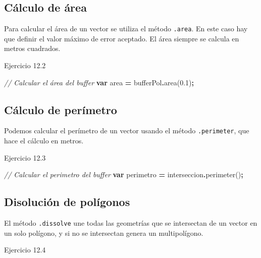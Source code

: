 \documentclass[
  12pt,
  letterpaper,
  twoside]{book}
\newenvironment{Shaded}{\begin{snugshade}}{\end{snugshade}}
\newcommand{\CommentTok}[1]{\textcolor[rgb]{0.56,0.35,0.01}{\textit{#1}}}
\newcommand{\FloatTok}[1]{\textcolor[rgb]{0.00,0.00,0.81}{#1}}
\newcommand{\FunctionTok}[1]{\textcolor[rgb]{0.00,0.00,0.00}{#1}}
\newcommand{\KeywordTok}[1]{\textcolor[rgb]{0.13,0.29,0.53}{\textbf{#1}}}
\newcommand{\NormalTok}[1]{#1}
\newcommand{\OperatorTok}[1]{\textcolor[rgb]{0.81,0.36,0.00}{\textbf{#1}}}
\begin{document}
\hypertarget{cuxe1lculo-de-uxe1rea}{%
\subsection{Cálculo de área}\label{cuxe1lculo-de-uxe1rea}}

Para calcular el área de un vector se utiliza el método \texttt{.area}. En este caso hay que definir el valor máximo de error aceptado. El área siempre se calcula en metros cuadrados.

Ejercicio 12.2

\begin{Shaded}
\begin{Highlighting}[]
\CommentTok{// Calcular el área del buffer}
\KeywordTok{var}\NormalTok{ area }\OperatorTok{=}\NormalTok{ bufferPol}\OperatorTok{.}\FunctionTok{area}\NormalTok{(}\FloatTok{0.1}\NormalTok{)}\OperatorTok{;}
\end{Highlighting}
\end{Shaded}

\hypertarget{cuxe1lculo-de-peruxedmetro}{%
\subsection{Cálculo de perímetro}\label{cuxe1lculo-de-peruxedmetro}}

Podemos calcular el perímetro de un vector usando el método \texttt{.perimeter}, que hace el cálculo en metros.

Ejercicio 12.3

\begin{Shaded}
\begin{Highlighting}[]
\CommentTok{// Calcular el perimetro del buffer}
\KeywordTok{var}\NormalTok{ perimetro }\OperatorTok{=}\NormalTok{ interseccion}\OperatorTok{.}\FunctionTok{perimeter}\NormalTok{()}\OperatorTok{;}
\end{Highlighting}
\end{Shaded}

\hypertarget{disoluciuxf3n-de-poluxedgonos}{%
\subsection{Disolución de polígonos}\label{disoluciuxf3n-de-poluxedgonos}}

El método \texttt{.dissolve} une todas las geometrías que se intersectan de un vector en un solo polígono, y si no se intersectan genera un multipolígono.

Ejercicio 12.4
\end{document}
